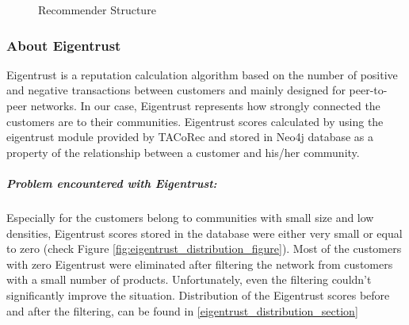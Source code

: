 \label{eigentrust_section}
	\begin{figure}[H]
		\centering
		\caption{Recommender Structure}
		\label{fig:eigentrust_structure}
	\end{figure}
	\subsubsection{About Eigentrust} \label{about_eigentrust}
	Eigentrust\cite{Eigentrust} is a reputation calculation algorithm based on the number of positive and negative transactions between customers and mainly designed for peer-to-peer networks. In our case, Eigentrust represents how strongly connected the customers are to their communities. Eigentrust scores calculated by using the eigentrust module provided by TACoRec and stored in Neo4j database as a property of the relationship between a customer and his/her community. 
	\subparagraph{Problem encountered with Eigentrust:}
	Especially for the customers belong to communities with small size and low densities, Eigentrust scores stored in the database were either very small or equal to zero (check Figure \ref{fig:eigentrust_distribution_figure}). Most of the customers with zero Eigentrust were eliminated after filtering the network from customers with a small number of products. Unfortunately, even the filtering couldn't significantly improve the situation. Distribution of the Eigentrust scores before and after the filtering, can be found in \ref{eigentrust_distribution_section}

